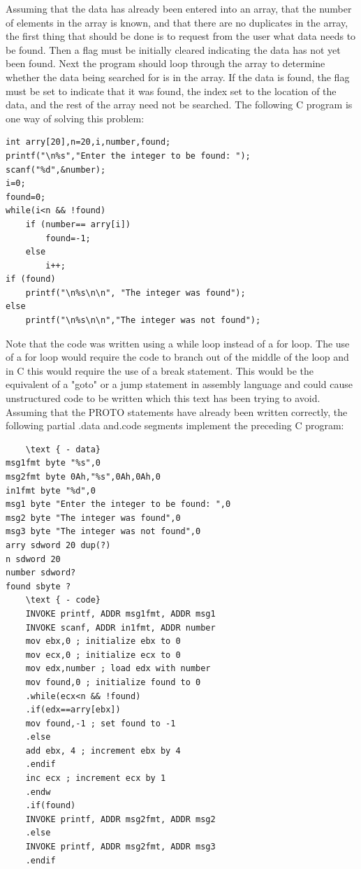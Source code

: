 \documentclass[10pt]{article}
\begin{document}
Assuming that the data has already been entered into an array, that the number of elements in the array is known, and that there are no duplicates in the array, the first thing that should be done is to request from the user what data needs to be found. Then a flag must be initially cleared indicating the data has not yet been found. Next the program should loop through the array to determine whether the data being searched for is in the array. If the data is found, the flag must be set to indicate that it was found, the index set to the location of the data, and the rest of the array need not be searched. The following C program is one way of solving this problem:

\begin{verbatim}
int arry[20],n=20,i,number,found;
printf("\n%s","Enter the integer to be found: ");
scanf("%d",&number);
i=0;
found=0;
while(i<n && !found)
    if (number== arry[i])
        found=-1;
    else
        i++;
if (found)
    printf("\n%s\n\n", "The integer was found");
else
    printf("\n%s\n\n","The integer was not found");
\end{verbatim}

Note that the code was written using a while loop instead of a for loop. The use of a for loop would require the code to branch out of the middle of the loop and in C this would require the use of a break statement. This would be the equivalent of a "goto" or a jump statement in assembly language and could cause unstructured code to be written which this text has been trying to avoid. Assuming that the PROTO statements have already been written correctly, the following partial .data and.code segments implement the preceding C program:

\begin{verbatim}
    \text { - data}
msg1fmt byte "%s",0
msg2fmt byte 0Ah,"%s",0Ah,0Ah,0
in1fmt byte "%d",0
msg1 byte "Enter the integer to be found: ",0
msg2 byte "The integer was found",0
msg3 byte "The integer was not found",0
arry sdword 20 dup(?)
n sdword 20
number sdword?
found sbyte ?
    \text { - code}
    INVOKE printf, ADDR msg1fmt, ADDR msg1
    INVOKE scanf, ADDR in1fmt, ADDR number
    mov ebx,0 ; initialize ebx to 0
    mov ecx,0 ; initialize ecx to 0
    mov edx,number ; load edx with number
    mov found,0 ; initialize found to 0
    .while(ecx<n && !found)
    .if(edx==arry[ebx])
    mov found,-1 ; set found to -1
    .else
    add ebx, 4 ; increment ebx by 4
    .endif
    inc ecx ; increment ecx by 1
    .endw
    .if(found)
    INVOKE printf, ADDR msg2fmt, ADDR msg2
    .else
    INVOKE printf, ADDR msg2fmt, ADDR msg3
    .endif
\end{verbatim}
\end{document}
